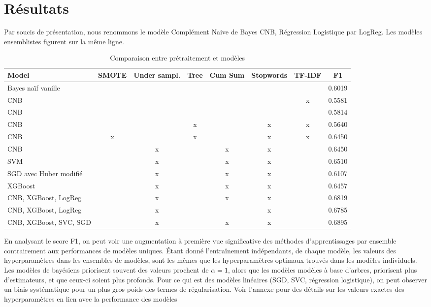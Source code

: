 \documentclass{article}
\begin{document}
\section{Résultats}
Par soucis de présentation, nous renommons le modèle Complément Naive de Bayes CNB, Régression Logistique par LogReg. Les modèles ensemblistes figurent sur la même ligne.
\begin{table}[H]
    \centering
    \begin{tabular}{|l|c|c|c|c|c|c|c|}
        \hline
        \textbf{Model} & \textbf{SMOTE} & \textbf{Under sampl.} & \textbf{Tree} &
        \textbf{Cum Sum} & \textbf{Stopwords} & \textbf{TF-IDF} &
        \textbf{F1} \\
        \hline
        Bayes naïf vanille &  &  &  &  &  &  & 0.6019 \\
        CNB &  &  &  &  &  & x & 0.5581\\
        CNB &  &  &  &  &  &  & 0.5814\\
        CNB &  &  & x &  & x & x & 0.5640\\
        CNB & x &  & x &  & x & x & 0.6450\\
        CNB &  & x &  & x & x &  & 0.6450\\
        SVM &  & x &  & x & x &  & 0.6510\\
        SGD avec Huber modifié &  & x &  & x & x &  & 0.6107\\
        XGBoost &  & x &  & x & x &  & 0.6457\\
        CNB, XGBoost, LogReg &  & x &  & x & x &  & 0.6819\\
        CNB, XGBoost, LogReg &  & x &  &  & x &  & 0.6785\\
        CNB, XGBoost, SVC, SGD &  & x &  & x & x &  & 0.6895\\
        \hline
    \end{tabular}
    \caption{Comparaison entre prétraitement et modèles}
    \label{tab:model_comparison}
\end{table}
En analysant le score F1, on peut voir une augmentation à première vue significative des méthodes d'apprentissages par ensemble contrairement aux performances de modèles uniques. Étant donné l'entraînement indépendants, de chaque modèle, les valeurs des hyperparamètres dans les ensembles de modèles, sont les mêmes que les hyperparamètres optimaux trouvés dans les modèles individuels. Les modèles de bayésiens priorisent souvent des valeurs prochent de $\alpha = 1$, alors que les modèles modèles à base d'arbres, priorisent plus d'estimateurs, et que ceux-ci soient plus profonds. Pour ce qui est des modèles linéaires (SGD, SVC, régression logistique), on peut observer un biais systématique pour un plus gros poids des termes de régularisation. Voir l'annexe pour des détails sur les valeurs exactes des hyperparamètres en lien avec la performance des modèles
\end{document}
